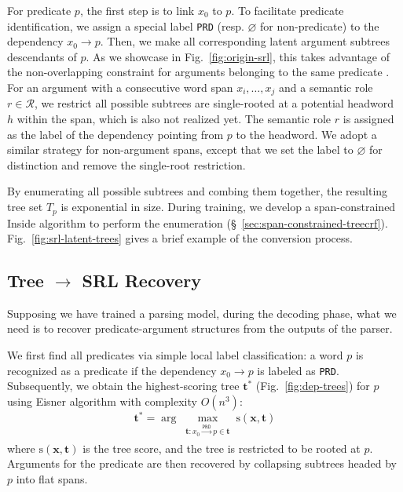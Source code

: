 \documentclass[11pt]{article}
\begin{document}
For predicate $p$, the first step is to link $x_0$ to $p$.
To facilitate predicate identification, we assign a special label \texttt{PRD} (resp. $\varnothing$ for non-predicate) to the dependency $x_0 \rightarrow p$.
Then, we make all corresponding latent argument subtrees descendants of $p$.
As we showcase in Fig.~\ref{fig:origin-srl}, this takes advantage of the non-overlapping constraint for arguments belonging to the same predicate \cite{punyakanok-etal-2004-semantic,li-etal-2019-dependency}.
For an argument with a consecutive word span $x_i,\dots,x_j$ and a semantic role $r\in \mathcal{R}$, we restrict all possible subtrees are single-rooted at a potential headword $h$ within the span, which is also not realized yet.
The semantic role $r$ is assigned as the label of the dependency pointing from $p$ to the headword.
We adopt a similar strategy for non-argument spans, except that we set the label to $\varnothing$  for distinction and remove the single-root restriction.

By enumerating all possible subtrees and combing them together, the resulting tree set $T_p$ is exponential in size.
During training, we develop a span-constrained Inside algorithm to perform the enumeration (\S~\ref{sec:span-constrained-treecrf}).
Fig.~\ref{fig:srl-latent-trees} gives a brief example of the conversion process.








\subsection{Tree $\rightarrow$ SRL Recovery}\label{sec:srl-recovery}
Supposing we have trained a parsing model, during the decoding phase, what we need is to recover predicate-argument structures from the outputs of the parser.

We first find all predicates via simple local label classification: a word $p$ is recognized as a predicate if the dependency $x_0\rightarrow p$ is labeled as \texttt{PRD}.
Subsequently, we obtain the highest-scoring tree $\boldsymbol{t}^{\ast}$ (Fig.~\ref{fig:dep-trees}) for $p$ using Eisner algorithm \cite{eisner-2000-bilexical} with complexity $O(n^3)$:
\begin{equation}\boldsymbol{t}^{\ast} = \arg\max_{\substack{\boldsymbol{t}: x_0 \xrightarrow[]{\texttt{PRD}} p\in\boldsymbol{t}}}
    \mathrm{s}(\boldsymbol{x},\boldsymbol{t})
\end{equation}
where $\mathrm{s}(\boldsymbol{x},\boldsymbol{t})$ is the tree score, and the tree is restricted to be rooted at $p$.
Arguments for the predicate are then recovered by collapsing subtrees headed by $p$ into flat spans.
\end{document}
